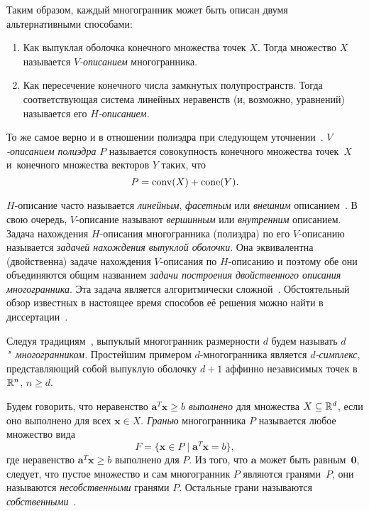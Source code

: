 Таким образом, каждый многогранник может быть описан двумя альтернативными способами:
\begin{enumerate}
	\item Как выпуклая оболочка конечного множества точек $X$. Тогда множество $X$ называется \emph{$V$-описанием} многогранника.
	\item Как пересечение конечного числа замкнутых полупространств. Тогда соответствующая система линейных неравенств (и, возможно, уравнений) называется его \emph{$H$-описанием.}
\end{enumerate}
То же самое верно и в отношении полиэдра при следующем уточнении~\cite{ZieglerBook}. \emph{$V$-описанием полиэдра} $P$ называется совокупность конечного множества точек~$X$ и~конечного множества векторов $Y$ таких, что
\[
P = \operatorname{conv}(X) + \operatorname{cone}(Y).
\]

$H$-описание часто называется \emph{линейным}, \emph{фасетным} или \emph{внешним} описанием~\cite{Schrijver:1998, Zolotykh:2012}.
В свою очередь, $V$-описание называют \emph{вершинным} или \emph{внутренним} описанием.
Задача нахождения $H$-описания многогранника (полиэдра) по его $V$-описанию называется \emph{задачей нахождения выпуклой оболочки}.
Она эквивалентна (двойственна) задаче нахождения $V$-описания по $H$-описанию и поэтому обе они объединяются общим названием \emph{задачи построения двойственного описания многогранника}.
Эта задача является алгоритмически сложной~\cite{Khachiyan:2008}.
Обстоятельный обзор известных в настоящее время способов её решения можно найти в диссертации~\cite{BastrakovDiss:2016}.

Следуя традициям~\cite{Grunbaum:2003, Emelichev:1981, ZieglerBook}, 
выпуклый многогранник размерности $d$ будем называть \emph{$d$"~многогранником.}
Простейшим примером $d$-многогранника является \emph{$d$-симплекс}, представляющий собой выпуклую оболочку $d+1$ аффинно независимых точек в $\mathbb{R}^n$, $n\ge d$.

Будем говорить, что неравенство $\bm{a}^T \bm{x} \ge b$ \emph{выполнено} для множества $X \subseteq \mathbb{R}^d$, 
если оно выполнено для всех $\bm{x}\in X$.
\emph{Гранью} многогранника $P$ называется любое множество вида 
\[
F = \{\bm{x} \in P \mid \bm{a}^T \bm{x} = b\},
\]
где неравенство $\bm{a}^T \bm{x} \ge b$ выполнено для $P$.
Из того, что $\bm{a}$ может быть равным~$\bm{0}$, следует, что пустое множество и сам многогранник $P$ являются гранями~$P$, они называются \emph{несобственными} гранями $P$.
Остальные грани называются \emph{собственными}~\cite{Emelichev:1981}.

